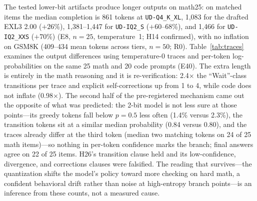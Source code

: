 \documentclass[11pt]{article}
\newcommand{\q}[1]{\texttt{#1}}
\begin{document}
The tested lower-bit artifacts produce longer outputs on math25: on matched items the median completion is 861 tokens at
\q{UD-Q4\_K\_XL}, 1,083 for the drafted EXL3 2.00 ($+26\%$), 1,381--1,447 for
\q{UD-IQ2\_S} ($+60$--$68\%$), and 1,466 for \q{UD-IQ2\_XXS} ($+70\%$) (E8,
$n=25$, temperature~1; H14 confirmed), with no inflation on GSM8K (409--434
mean tokens across tiers, $n=50$; R0). Table~\ref{tab:traces} examines the output differences using temperature-0 traces and per-token log-probabilities on the
same 25 math and 20 code prompts (E40). The extra length is entirely in the
math reasoning and it is re-verification: 2.4$\times$ the ``Wait''-class
transitions per trace and explicit self-corrections up from 1 to 4, while
code does not inflate (0.98$\times$). The second half of the pre-registered
mechanism came out the opposite of what was predicted: the 2-bit model is
not less sure at those points---its greedy tokens fall below $p=0.5$ less
often (1.4\% versus 2.3\%), the transition tokens sit at a similar median
probability (0.84 versus 0.80), and the traces already differ at the third
token (median two matching tokens on 24 of 25 math items)---so nothing in
per-token confidence marks the branch; final answers agree on 22 of 25 items.
H26's transition clause held and its low-confidence, divergence, and
corrections clauses were falsified. The reading that survives---the
quantization shifts the model's policy toward more checking on hard math, a
confident behavioral drift rather than noise at high-entropy branch
points---is an inference from these counts, not a measured cause.
\end{document}
